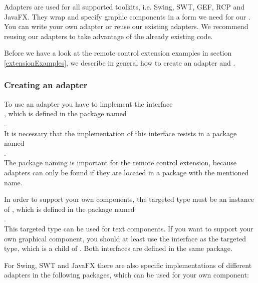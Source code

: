 
Adapters are used for all supported toolkits, i.e. Swing, SWT, GEF, RCP and JavaFX.
They wrap and specify graphic components in a form we need for our
\gdtesterclasses. You can write your own adapter or reuse our existing
adapters. We recommend reusing our adapters to take advantage of the already
existing code.

Before we have a look at the remote control extension examples in section
\ref{extensionExamples}, we describe in general how to create an
adapter and \gdtesterclasses.

\subsubsection{Creating an adapter}

To use an adapter you have to implement the interface\\
, which is defined in the package named\\
.\\
It is necessary that the implementation of this interface resists in a package
named\\
.\\
The package naming is important for the remote control extension, because
adapters can only be found if they are located in a package with the mentioned name.

In order to support your own components, the targeted type must be an instance
of , which is defined in the package named\\
.\\
This targeted type can be used for text components. If you want to support your
own graphical component, you should at least use the interface
 as the targeted type, which is a child of
. Both interfaces are defined in the same package.

For Swing, SWT and JavaFX there are also specific implementations of different
adapters in the following packages, which can be used for your own component:\\
\\
\\

